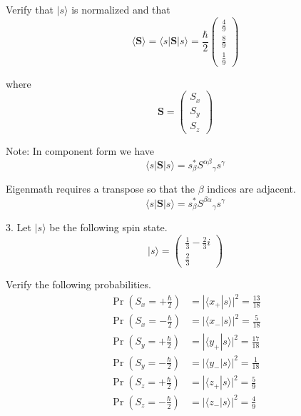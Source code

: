Verify that $|s\rangle$ is normalized and that
\begin{equation*}
\langle\mathbf S\rangle
=\langle s|\mathbf S|s\rangle
=\frac{\hbar}{2}\begin{pmatrix}\frac{4}{9}\\[1ex]\frac{8}{9}\\[1ex]\frac{1}{9}\end{pmatrix}
\end{equation*}

where
\begin{equation*}
\mathbf S=\begin{pmatrix}S_x\\S_y\\S_z\end{pmatrix}
\end{equation*}

Note: In component form we have
\begin{equation*}
\langle s|\mathbf S|s\rangle
=s_\beta^*{S^{\alpha\beta}}_\gamma s^\gamma
\end{equation*}

Eigenmath requires a transpose so that the $\beta$ indices are adjacent.
\begin{equation*}
\langle s|\mathbf S|s\rangle
=s_\beta^*{S^{\beta\alpha}}_\gamma s^\gamma
\end{equation*}

3. Let $|s\rangle$ be the following spin state.
\begin{equation*}
|s\rangle=\begin{pmatrix}\frac{1}{3}-\frac{2}{3}i\\[1ex]\frac{2}{3}\end{pmatrix}
\end{equation*}

Verify the following probabilities.
\begin{align*}
\Pr\left(S_x=+\tfrac{\hbar}{2}\right)&=|\langle x_+|s\rangle|^2=\tfrac{13}{18}
\\
\Pr\left(S_x=-\tfrac{\hbar}{2}\right)&=|\langle x_-|s\rangle|^2=\tfrac{5}{18}
\\[1ex]
\Pr\left(S_y=+\tfrac{\hbar}{2}\right)&=|\langle y_+|s\rangle|^2=\tfrac{17}{18}
\\
\Pr\left(S_y=-\tfrac{\hbar}{2}\right)&=|\langle y_-|s\rangle|^2=\tfrac{1}{18}
\\[1ex]
\Pr\left(S_z=+\tfrac{\hbar}{2}\right)&=|\langle z_+|s\rangle|^2=\tfrac{5}{9}
\\
\Pr\left(S_z=-\tfrac{\hbar}{2}\right)&=|\langle z_-|s\rangle|^2=\tfrac{4}{9}
\end{align*}

